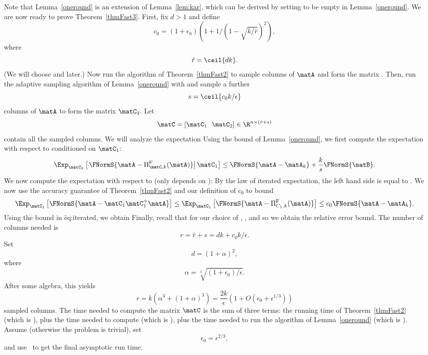 Note that Lemma~\ref{oneround} is an extension of Lemma~\ref{lem:kar}, which can be derived by setting  to be empty in
Lemma~\ref{oneround}.   We are now ready to prove  Theorem~\ref{thmFast3}.
First, fix $d>1$ and define 
$$c_0=\left(1+\epsilon_0\right) \left(1+{1}/{\left(1-\sqrt{k/\hat r} \right)^2} \right),$$
where 
$$\hat r=\ceil{dk}.$$ 
(We will choose  and  later.)
Now run the algorithm of Theorem~\ref{thmFast2} to sample
 columns of $\matA$ and form the matrix . Then, run the adaptive sampling algorithm of Lemma~\ref{oneround} with  and
sample a further  $$s = \ceil{c_0k/
\epsilon}$$ columns of $\matA$ to form the matrix $\matC_2$.
Let 
$$\matC = [\matC_1\ \ \matC_2]\in\R^{n\times\left(\hat{r}+s\right)}$$
contain all the
sampled columns. We will analyze the expectation
Using the bound of Lemma~\ref{oneround}, we first compute the expectation
with respect to  conditioned on $\matC_1$:
$$
\Exp_{\matC_2}\left[\left.\FNormS{\matA - \Pi^{\mathrm{F}}_{\matC,k}(\matA)}
\right|\matC_1\right]
\le \FNormS{\matA-\matA_k}+\frac{k}{s} \FNormS{\matB}.
$$
We now compute the expectation with respect to  (only
\math{\matB} depends on ):
By the law of iterated expectation, the left hand side is equal to .
We now use the accuracy guarantee of Theorem~\ref{thmFast2} and
our definition of $c_0$ to bound
$$\Exp_{\matC_1}\left[\FNormS{\matA-\matC_1\matC_1^+\matA}\right]
\le \Exp_{\matC_1}\left[\FNormS{\matA-\Pi^{\mathrm{F}}_{C_1,k}(\matA)}\right] \le c_0
\FNormS{\matA-\matA_k}.$$
Using the bound in \r{eq:iterated}, we obtain
Finally, recall that for our choice of ,  ,
and so we obtain
the relative error bound. The number of columns needed is
$$r=\hat r+s=dk+c_0k/\epsilon.$$ 
Set
$$d=(1+\alpha)^2,$$ where
$$\alpha=\sqrt[3]{(1+\epsilon_0)/\epsilon}.$$ After some algebra,
this
yields
$$
r=k\left( \alpha^3+\left(1+\alpha\right)^3\right)=\frac{2k}{\epsilon}\left(1+O\left(\epsilon_0+\epsilon^{1/3} \right) \right)
$$
sampled columns.
The time needed to compute the matrix $\matC$ is the sum of three terms:
the running time of Theorem~\ref{thmFast2} (which is
),
plus the time needed to compute 
(which is ), plus the time needed to run the algorithm
of Lemma~\ref{oneround} (which is ).
Assume  (otherwise the problem is trivial),
set 
$$
\epsilon_0=\epsilon^{2/3},
$$
and use~ to get the final
asymptotic run time.

